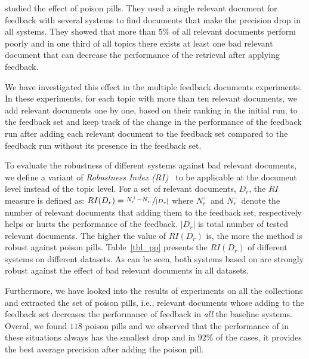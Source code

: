 \citet{Terra:2005} studied the effect of poison pills. They used a single relevant document for feedback with several systems to find documents that make the precision drop in all systems. They showed that more than $5\%$ of all relevant documents perform poorly and in one third of all topics there exists at least one bad relevant document that can decrease the performance of the retrieval after applying feedback.

We have investigated this effect in the multiple feedback documents experiments. In these experiments, for each topic with more than ten relevant documents, we add relevant documents one by one, based on their ranking in the initial run, to the feedback set and keep track of the change in the performance of the feedback run after adding each relevant document to the feedback set compared to the feedback run without its presence in the feedback set.  
%

%

To evaluate the robustness of different systems against bad relevant documents, we define a variant of \emph{Robustness Index ($RI$)}~\citep{Collins-Thompson:2007} to be applicable at the document level instead of the topic level. For a set of relevant documents, $D_r$, the $RI$ measure is defined as: $RI(D_r)= \nicefrac{N_r^+ -  N_r^-}{|D_r|}$ where $N_r^+$ and $N_r^-$ denote the number of relevant documents that adding them to the feedback set, respectively helps or hurts the performance of the feedback. $|D_r|$ is total number of tested relevant documents. The higher the value of $RI(D_r)$ is, the more the method is robust against poison pills. Table~\ref{tbl_pp} presents the $RI(D_r)$ of different systems on different datasets. As can be seen, both systems based on \swlms  are strongly robust against the effect of bad relevant documents in all datasets. 

Furthermore, we have looked into the results of experiments on all the collections and extracted the set of poison pills, i.e., relevant documents whose adding to the feedback set decreases the  performance of feedback in \emph{all} the baseline systems. 
Overal, we found $118$ poison pills and we observed that the performance of \acrswlm  in these situations always has the smallest drop and in $92\%$ of the cases, it provides the best average precision after adding the poison pill. 

